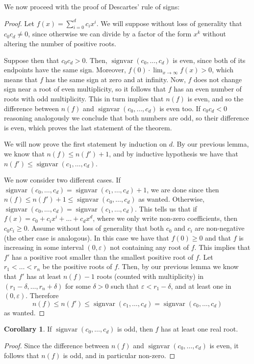 \documentclass[11pt, a4paper]{article}
\DeclareMathOperator{\sv}{signvar}
\theoremstyle{plain}
\theoremstyle{definition}
\newtheorem{coro}[prop]{Corollary}
\begin{document}
We now proceed with the proof of Descartes' rule of signs:

\begin{proof} Let $f(x)=\sum_{i=0}^d c_ix^i$. We will suppose without loss of generality that $c_0c_d\neq 0$, since otherwise we can divide by a factor of the form $x^k$ without altering the number of positive roots.

Suppose then that $c_0c_d>0$. Then, $\sv(c_0,\dots,c_d)$ is even, since both of its endpoints have the same sign. Moreover, $f(0)\cdot\lim_{x\to\infty} f(x)>0$, which means that $f$ has the same sign at zero and at infinity. Now, $f$ does not change sign near a root of even multiplicity, so it follows that $f$ has an even number of roots with odd multiplicity. This in turn implies that $n(f)$ is even, and so the difference between $n(f)$ and $\sv(c_0,\dots,c_d)$ is even too. If $c_0c_d<0$ reasoning analogously we conclude that both numbers are odd, so their difference is even, which proves the last statement of the theorem.

We will now prove the first statement by induction on $d$. By our previous lemma, we know that $n(f)\leq n(f')+1$, and by inductive hypothesis we have that $n(f')\leq \sv(c_1,\dots, c_d)$.

We now consider two different cases. If $\sv(c_0,\dots, c_d) = \sv(c_1,\dots, c_d)+1$, we are done since then $n(f)\leq n(f')+1\leq \sv(c_0,\dots, c_d)$ as wanted. Otherwise, $\sv(c_0,\dots, c_d) = \sv(c_1,\dots, c_d)$. This tells us that if $f(x)=c_0+c_ix^i+\dots+c_dx^d$, where we only write non-zero coefficients, then $c_0c_i\geq 0$. Assume without loss of generality that both $c_0$ and $c_i$ are non-negative (the other case is analogous). In this case we have that $f(0)\geq 0$ and that $f$ is increasing in some interval $(0,\varepsilon)$ not containing any root of $f$. This implies that $f'$ has a positive root smaller than the smallest positive root of $f$. Let $r_1<\dots<r_n$ be the positive roots of $f$. Then, by our previous lemma we know that $f'$ has at least $n(f)-1$ roots (counted with multiplicity) in $(r_1-\delta,\dots,r_n+\delta)$ for some $\delta>0$ such that $\varepsilon < r_1-\delta$, and at least one in $(0,\varepsilon)$. Therefore 
\[n(f)\leq n(f')\leq \sv(c_1,\dots,c_d)=\sv(c_0,\dots,c_d)\]
as wanted.
\end{proof}

\begin{coro} If $\sv(c_0,\dots,c_d)$ is odd, then $f$ has at least one real root.
\end{coro}
\begin{proof} Since the difference between $n(f)$ and $\sv(c_0,\dots,c_d)$ is even, it follows that $n(f)$ is odd, and in particular non-zero.
\end{proof}
\end{document}
